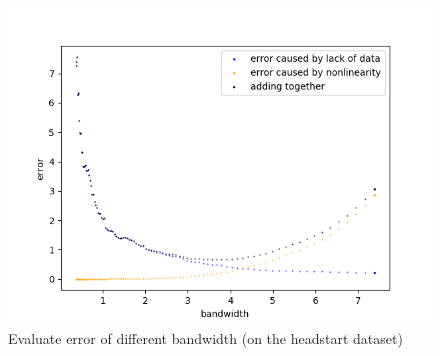 \documentclass[a4 paper,12pt]{article}
\begin{document}
\begin{figure}[h]
	\centering
	\includegraphics[scale=1]{Figure_5.png}
	\caption{Evaluate error of different bandwidth (on the headstart dataset)}
	\label{table:opt bandwidth}
\end{figure}
\end{document}
